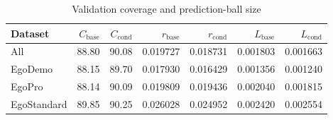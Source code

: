 \begin{table}[htbp]
\centering
\small
\caption{Validation coverage and prediction-ball size}
\label{tab:coverage}
\setlength{\tabcolsep}{4pt}
\begin{tabular}{lrrrrrr}
\toprule
Dataset & $C_{\mathrm{base}}$ & $C_{\mathrm{cond}}$ & $r_{\mathrm{base}}$ & $r_{\mathrm{cond}}$ & $L_{\mathrm{base}}$ & $L_{\mathrm{cond}}$\\
\midrule
All & 88.80 & 90.08 & 0.019727 & 0.018731 & 0.001803 & 0.001663\\
EgoDemo & 88.15 & 89.70 & 0.017930 & 0.016429 & 0.001356 & 0.001240\\
EgoPro & 88.14 & 90.09 & 0.019809 & 0.019436 & 0.002040 & 0.001815\\
EgoStandard & 89.85 & 90.25 & 0.026028 & 0.024952 & 0.002420 & 0.002554\\
\bottomrule
\end{tabular}
\end{table}
